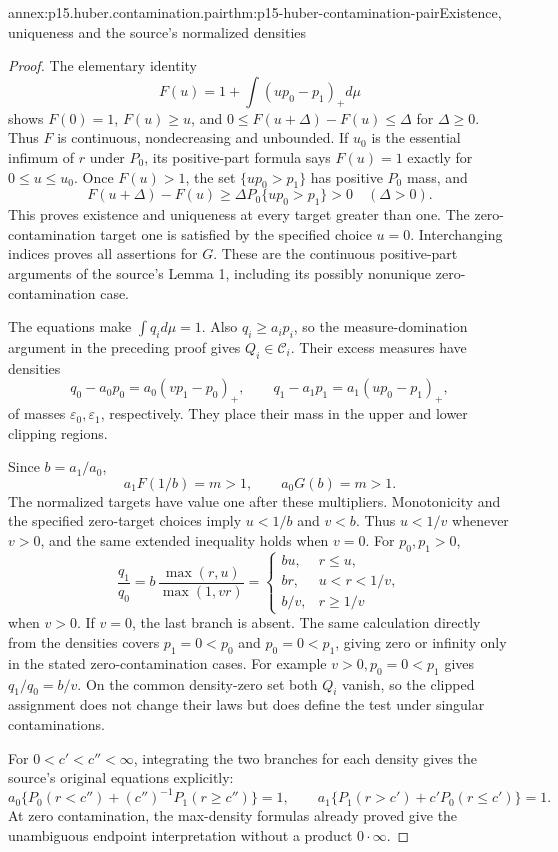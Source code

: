 \begin{annexitem}{annex:p15.huber.contamination.pair}{thm:p15-huber-contamination-pair}{Existence, uniqueness and the source's normalized densities}
\begin{proof}
The elementary identity
\[
 F(u)=1+\int(up_0-p_1)_+d\mu
\]
shows \(F(0)=1\), \(F(u)\geq u\), and
\(0\leq F(u+\Delta)-F(u)\leq\Delta\) for \(\Delta\geq0\).
Thus \(F\) is continuous, nondecreasing and unbounded.
If \(u_0\) is the essential infimum of \(r\) under \(P_0\), its
positive-part formula says \(F(u)=1\) exactly for \(0\leq u\leq u_0\).
Once \(F(u)>1\), the set \(\{up_0>p_1\}\) has positive \(P_0\) mass,
and
\[
 F(u+\Delta)-F(u)\geq
        \Delta P_0\{up_0>p_1\}>0\quad(\Delta>0).
\]
This proves existence and uniqueness at every target greater than one.
The zero-contamination target one is satisfied by the specified choice
\(u=0\). Interchanging indices proves all assertions for \(G\).
These are the continuous positive-part arguments of the source's
Lemma 1, including its possibly nonunique zero-contamination case.

The equations make \(\int q_i d\mu=1\).
Also \(q_i\geq a_ip_i\), so the measure-domination argument in the
preceding proof gives \(Q_i\in\mathcal C_i\).
Their excess measures have densities
\[
 q_0-a_0p_0=a_0(vp_1-p_0)_+,\qquad
 q_1-a_1p_1=a_1(up_0-p_1)_+,
\]
of masses \(\varepsilon_0,\varepsilon_1\), respectively.
They place their mass in the upper and lower clipping regions.

Since \(b=a_1/a_0\),
\[
 a_1F(1/b)=m>1,\qquad a_0G(b)=m>1.
\]
The normalized targets have value one after these multipliers.
Monotonicity and the specified zero-target choices imply \(u<1/b\)
and \(v<b\). Thus \(u<1/v\) whenever \(v>0\), and the same extended
inequality holds when \(v=0\).
For \(p_0,p_1>0\),
\[
 \frac{q_1}{q_0}
 =b\,\frac{\max(r,u)}{\max(1,vr)}
 =
 \begin{cases}
 bu,&r\leq u,\\
 br,&u<r<1/v,\\
 b/v,&r\geq1/v
 \end{cases}
\]
when \(v>0\). If \(v=0\), the last branch is absent.
The same calculation directly from the densities covers \(p_1=0<p_0\)
and \(p_0=0<p_1\), giving zero or infinity only in the stated
zero-contamination cases.
For example \(v>0,p_0=0<p_1\) gives \(q_1/q_0=b/v\).
On the common density-zero set both \(Q_i\) vanish, so the clipped
assignment does not change their laws but does define the test under
singular contaminations.

For \(0<c'<c''<\infty\), integrating the two branches for each density
gives the source's original equations explicitly:
\[
 a_0\{P_0(r<c'')+(c'')^{-1}P_1(r\geq c'')\}=1,\qquad
 a_1\{P_1(r>c')+c'P_0(r\leq c')\}=1.
\]
At zero contamination, the max-density formulas already proved give
the unambiguous endpoint interpretation without a product \(0\cdot\infty\).
\end{proof}
\end{annexitem}

